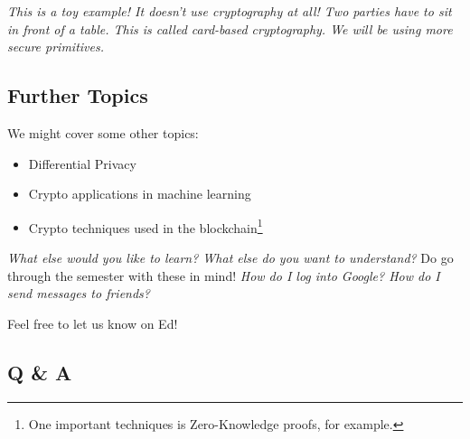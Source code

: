 \emph{This is a toy example! It doesn't use cryptography at all! Two parties have to sit in front of a table. This is called card-based cryptography. We will be using more secure primitives.}

\subsection{Further Topics}
We might cover some other topics:
\begin{itemize}
    \item Differential Privacy
    \item Crypto applications in machine learning
    \item Crypto techniques used in the blockchain\footnote{One important techniques is Zero-Knowledge proofs, for example.}
\end{itemize}
\emph{What else would you like to learn? What else do you want to understand?} Do go through the semester with these in mind! \emph{How do I log into Google? How do I send messages to friends?}

Feel free to let us know on Ed!

\subsection{Q \& A}

